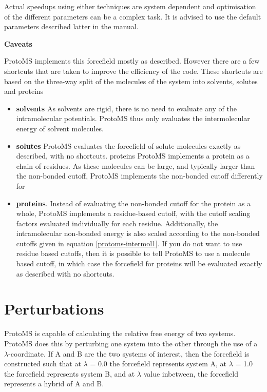 \documentclass[letterpaper,10pt,english]{sphinxmanual}
\begin{document}
Actual speedups using either techniques are system dependent and optimisation of the different parameters can be a complex task. It is advised to use the default parameters described latter in the manual.

\textbf{Caveats}

ProtoMS implements this forcefield mostly as described. However there are a few shortcuts that are taken to improve the efficiency of the code. These shortcuts are based on the three-way split of the molecules of the system into solvents, solutes and proteins
\begin{itemize}
\item {} 
\textbf{solvents} As solvents are rigid, there is no need to evaluate any of the intramolecular potentials. ProtoMS thus only evaluates the intermolecular energy of solvent molecules.

\item {} 
\textbf{solutes} ProtoMS evaluates the forcefield of solute molecules exactly as described, with no shortcuts. proteins ProtoMS implements a protein as a chain of residues. As these molecules can be large, and typically larger than the non-bonded cutoff, ProtoMS implements the non-bonded cutoff differently for

\item {} 
\textbf{proteins}. Instead of evaluating the non-bonded cutoff for the protein as a whole, ProtoMS implements a residue-based cutoff, with the cutoff scaling factors evaluated individually for each residue. Additionally, the intramolecular non-bonded energy is also scaled according to the non-bonded cutoffs given in equation \eqref{protoms-intermol1}. If you do not want to use residue based cutoffs, then it is possible to tell ProtoMS to use a molecule based cutoff, in which case the forcefield for proteins will be evaluated exactly as described with no shortcuts.

\end{itemize}


\section{Perturbations}
\label{protoms:index-14}\label{protoms:perturbations}
ProtoMS is capable of calculating the relative free energy of two systems. ProtoMS does this by perturbing one system into the other through the use of a \(\lambda\)-coordinate. If A and B are the two systems of interest, then the forcefield is constructed such that at \(\lambda\) = 0.0 the forcefield represents system A, at \(\lambda\) = 1.0 the forcefield represents system B, and at \(\lambda\) value inbetween, the forcefield represents a hybrid of A and B.
\end{document}
